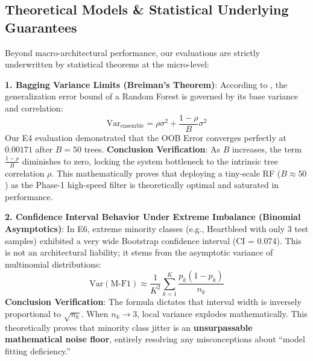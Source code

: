 \documentclass[sigconf]{acmart}
\begin{document}
\subsection{Theoretical Models \& Statistical Underlying Guarantees}

Beyond macro-architectural performance, our evaluations are strictly underwritten by statistical theorems at the micro-level:

\textbf{1. Bagging Variance Limits (Breiman's Theorem)}: According to \cite{11}, the generalization error bound of a Random Forest is governed by its base variance and correlation:
$$ \text{Var}_{\text{ensemble}} = \rho\sigma^2 + \frac{1-\rho}{B}\sigma^2 $$
Our E4 evaluation demonstrated that the OOB Error converges perfectly at $0.00171$ after $B=50$ trees. \textbf{Conclusion Verification}: As $B$ increases, the term $\frac{1-\rho}{B}$ diminishes to zero, locking the system bottleneck to the intrinsic tree correlation $\rho$. This mathematically proves that deploying a tiny-scale RF ($B \approx 50$) as the Phase-1 high-speed filter is theoretically optimal and saturated in performance.

\textbf{2. Confidence Interval Behavior Under Extreme Imbalance (Binomial Asymptotics)}: In E6, extreme minority classes (e.g., Heartbleed with only 3 test samples) exhibited a very wide Bootstrap confidence interval (CI = 0.074). This is not an architectural liability; it stems from the asymptotic variance of multinomial distributions:
$$ \text{Var}(\text{M-F1}) \approx \frac{1}{K^2} \sum_{k=1}^K \frac{p_k(1-p_k)}{n_k} $$
\textbf{Conclusion Verification}: The formula dictates that interval width is inversely proportional to $\sqrt{n_k}$. When $n_k \to 3$, local variance explodes mathematically. This theoretically proves that minority class jitter is an \textbf{unsurpassable mathematical noise floor}, entirely resolving any misconceptions about ``model fitting deficiency.''
\end{document}
